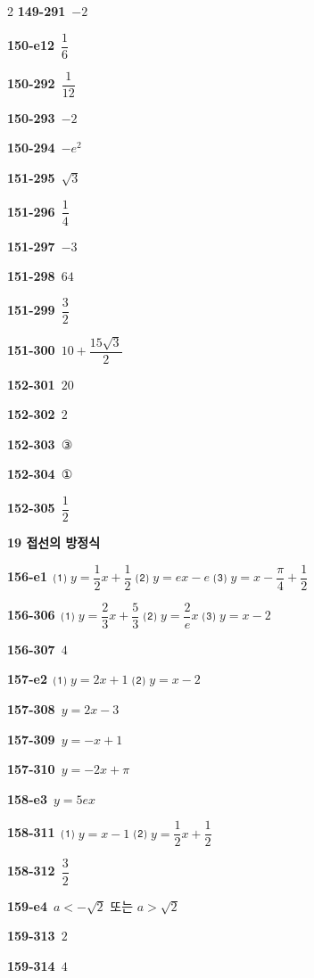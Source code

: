 \documentclass[10pt,a4paper]{article}
\begin{document}
\begin{multicols}{2}
\noindent\textbf{149-291}\ $-2$\par
\noindent\textbf{150-e12}\ $\dfrac{1}{6}$\par
\noindent\textbf{150-292}\ $\dfrac{1}{12}$\par
\noindent\textbf{150-293}\ $-2$\par
\noindent\textbf{150-294}\ $-e^2$\par
\noindent\textbf{151-295}\ $\sqrt{3}$\par
\noindent\textbf{151-296}\ $\dfrac{1}{4}$\par
\noindent\textbf{151-297}\ $-3$\par
\noindent\textbf{151-298}\ $64$\par
\noindent\textbf{151-299}\ $\dfrac{3}{2}$\par
\noindent\textbf{151-300}\ $10+\dfrac{15\sqrt{3}}{2}$\par
\noindent\textbf{152-301}\ $20$\par
\noindent\textbf{152-302}\ $2$\par
\noindent\textbf{152-303}\ ③\par
\noindent\textbf{152-304}\ ①\par
\noindent\textbf{152-305}\ $\dfrac{1}{2}$\par
\noindent\textbf{19 접선의 방정식}\par\smallskip
\noindent\textbf{156-e1}\ ⑴ $y=\dfrac{1}{2}x+\dfrac{1}{2}$ ⑵ $y=ex-e$ ⑶ $y=x-\dfrac{\pi}{4}+\dfrac{1}{2}$\par
\noindent\textbf{156-306}\ ⑴ $y=\dfrac{2}{3}x+\dfrac{5}{3}$ ⑵ $y=\dfrac{2}{e}x$ ⑶ $y=x-2$\par
\noindent\textbf{156-307}\ $4$\par
\noindent\textbf{157-e2}\ ⑴ $y=2x+1$ ⑵ $y=x-2$\par
\noindent\textbf{157-308}\ $y=2x-3$\par
\noindent\textbf{157-309}\ $y=-x+1$\par
\noindent\textbf{157-310}\ $y=-2x+\pi$\par
\noindent\textbf{158-e3}\ $y=5ex$\par
\noindent\textbf{158-311}\ ⑴ $y=x-1$ ⑵ $y=\dfrac{1}{2}x+\dfrac{1}{2}$\par
\noindent\textbf{158-312}\ $\dfrac{3}{2}$\par
\noindent\textbf{159-e4}\ $a<-\sqrt{2}$ 또는 $a>\sqrt{2}$\par
\noindent\textbf{159-313}\ $2$\par
\noindent\textbf{159-314}\ $4$\par

\end{multicols}
\end{document}
